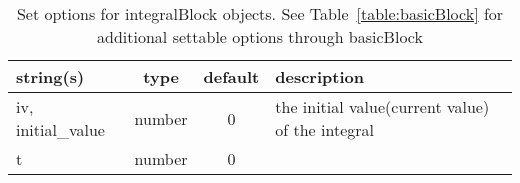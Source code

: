 \begin{table}[ht]
\centering
\begin{tabular}{p{5cm} c c p{7cm}}
\hline
string(s) & type & default & description \\
\hline
iv, initial\_value & number & 0 & the initial value(current value) of the integral\\
t & number & 0 & \\
\hline
\end{tabular}
\caption{Set options for integralBlock objects. See Table~\ref{table:basicBlock} for additional settable options through basicBlock}
\label{table:integralBlock}
\end{table}
